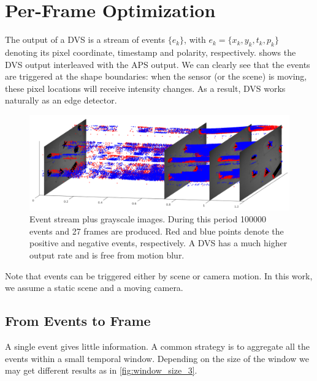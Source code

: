 \chapter{Per-Frame Optimization}
\label{chap:per_frame}
The output of a DVS is a stream of events $\{e_k\}$, with
$e_k=\{x_k,y_k,t_k,p_k\}$ denoting its pixel coordinate, timestamp and
polarity, respectively.  shows the DVS output
interleaved with the APS output. We can clearly see that the events
are triggered at the shape boundaries: when the sensor (or the scene)
is moving, these pixel locations will receive intensity changes. As a
result, DVS works naturally as an edge detector.

\begin{figure}[h]
  \centering \includegraphics[width = \textwidth]{images/stream.png}
  \caption{Event stream plus grayscale images. During this period
    \num{100000} events and \num{27} frames are produced. Red and blue
    points denote the positive and negative events, respectively. A DVS
    has a much higher output rate and is free from motion blur.}
  \label{fig:stream}
\end{figure}
Note that events can be triggered either by scene or camera motion. In
this work, we assume a static scene and a moving camera.
\section{From Events to Frame}
\label{sec:event_warp}
A single event gives little information. A common strategy is to
aggregate all the events within a small temporal window. Depending on
the size of the window we may get different results as in
\cref{fig:window_size_3}.

